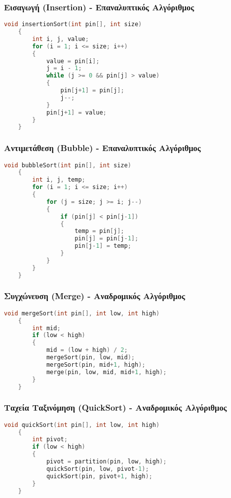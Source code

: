 \documentclass[a4paper,12pt]{article}
\begin{document}
\subsubsection{Εισαγωγή \textbf{(Insertion)} - Επαναλυπτικός Αλγόριθμος}
\begin{lstlisting}[language=c]
    void insertionSort(int pin[], int size)
    {
        int i, j, value;
        for (i = 1; i <= size; i++)
        {
            value = pin[i];
            j = i - 1;
            while (j >= 0 && pin[j] > value)
            {
                pin[j+1] = pin[j];
                j--;
            }
            pin[j+1] = value;
        }
    }
\end{lstlisting}

\newpage
\subsubsection{Αντιμετάθεση \textbf{(Bubble)} - Επαναλυπτικός Αλγόριθμος}
\begin{lstlisting}[language=c]
    void bubbleSort(int pin[], int size)
    {
        int i, j, temp;
        for (i = 1; i <= size; i++)
        {
            for (j = size; j >= i; j--)
            {
                if (pin[j] < pin[j-1])
                {
                    temp = pin[j];
                    pin[j] = pin[j-1];
                    pin[j-1] = temp;
                }
            }
        }
    }
\end{lstlisting}

\subsubsection{Συγχώνευση \textbf{(Merge)} - Αναδρομικός Αλγόριθμος}
\begin{lstlisting}[language=c]
    void mergeSort(int pin[], int low, int high)
    {
        int mid;
        if (low < high)
        {
            mid = (low + high) / 2;
            mergeSort(pin, low, mid);
            mergeSort(pin, mid+1, high);
            merge(pin, low, mid, mid+1, high);
        }
    }
\end{lstlisting}

\subsubsection{Ταχεία Ταξινόμηση \textbf{(QuickSort)} - Αναδρομικός Αλγόριθμος}
\begin{lstlisting}[language=c]
    void quickSort(int pin[], int low, int high)
    {
        int pivot;
        if (low < high)
        {
            pivot = partition(pin, low, high);
            quickSort(pin, low, pivot-1);
            quickSort(pin, pivot+1, high);
        }
    }
\end{lstlisting}
\end{document}
